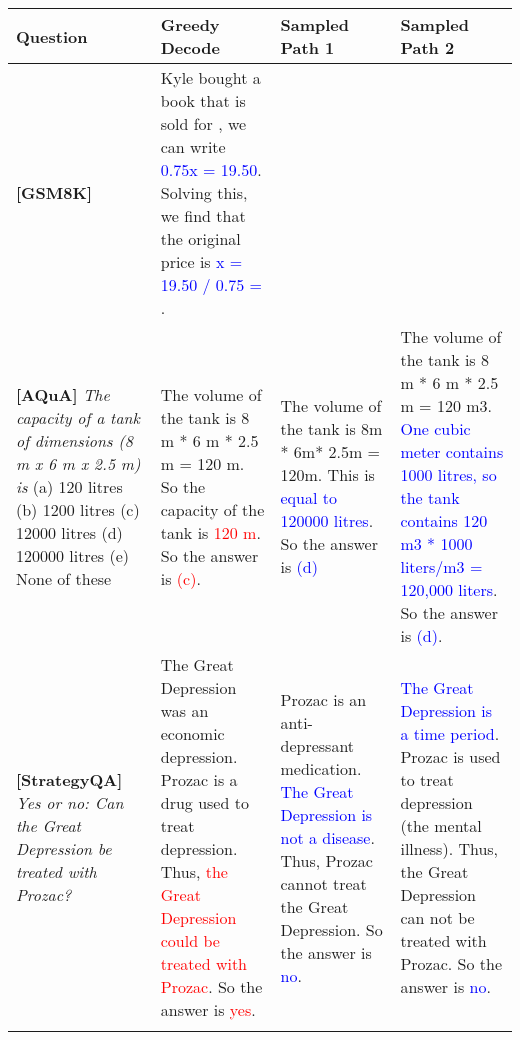 \begin{table}[h]
\setlength\tabcolsep{4pt}
\scriptsize
    \centering
    \begin{tabular}{p{3cm} | p{3.3cm} | p{3cm} | p{3.4cm} }
        Question & Greedy Decode & Sampled Path 1 & Sampled Path 2  \\
         \midrule
         \textbf{[GSM8K]} \textit{Kyle bought last year's best-selling book for \19.50. This is 25\% less than the original price. This means the original price was 100\%. 25\% of 100\% is 25\%. So the original price was 100\% - 25\% = 75\%. \textcolor{red}{The original price was 75\% of \19.50 is 75\% * \14.625. The answer is \textcolor{red}{\19.50. Since it was discounted by 25\%, \textcolor{blue}{the original price was 19.50 / 0.75 = 26}. The answer is \textcolor{blue}{26}. & Kyle bought a book that is sold for \19.50, we can write \textcolor{blue}{0.75x = 19.50}. Solving this, we find that the original price is \textcolor{blue}{x = 19.50 / 0.75 = \26}.\\
         \midrule
        \textbf{[AQuA]} \textit{The capacity of a tank of dimensions (8 m x 6 m x 2.5 m) is} (a) 120 litres (b) 1200 litres (c) 12000 litres (d) 120000 litres (e) None of these
         & The volume of the tank is 8 m * 6 m * 2.5 m = 120 m. So the capacity of the tank is \textcolor{red}{120 m}. So the answer is \textcolor{red}{(c)}.
         & The volume of the tank is 8m * 6m* 2.5m = 120m. This is \textcolor{blue}{equal to 120000 litres}. So the answer is \textcolor{blue}{(d)} 
         & 
         The volume of the tank is 8 m * 6 m * 2.5 m = 120 m3. \textcolor{blue}{One cubic meter contains 1000 litres, so the tank contains 120 m3 * 1000 liters/m3 = 120,000 liters}. So the answer is \textcolor{blue}{(d)}.\\
         \midrule
         \textbf{[StrategyQA]} \textit{Yes or no: Can the Great Depression be treated with Prozac?}
         & The Great Depression was an economic depression. Prozac is a drug used to treat depression. Thus, \textcolor{red}{the Great Depression could be treated with Prozac}. So the answer is \textcolor{red}{yes}.
         & Prozac is an anti-depressant medication. \textcolor{blue}{The Great Depression is not a disease}. Thus, Prozac cannot treat the Great Depression. So the answer is \textcolor{blue}{no}.
         & \textcolor{blue}{The Great Depression is a time period}. Prozac is used to treat depression (the mental illness). Thus, the Great Depression can not be treated with Prozac. So the answer is \textcolor{blue}{no}.\\
}}}
\end{tabular}
\end{table}
